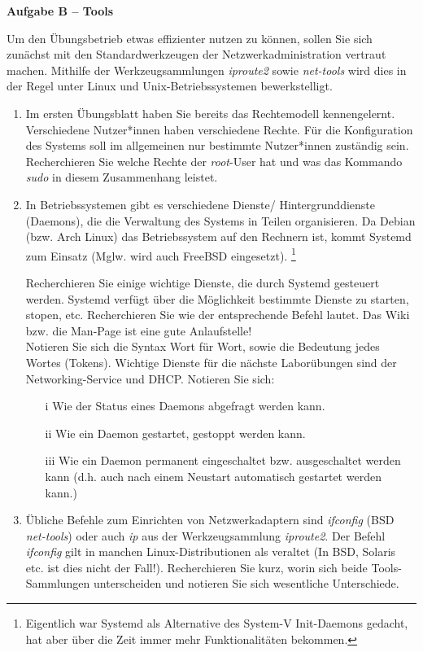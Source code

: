 \documentclass[paper=a4,fontsize=11pt]{scrartcl}%
\numberwithin{equation}{section}
\begin{document}
\begin{center}\Large{\textbf{Aufgabe B -- Tools}}\end{center}\vskip0.25in
Um den Übungsbetrieb etwas effizienter nutzen zu können, sollen Sie sich zunächst mit den Standardwerkzeugen der Netzwerkadministration vertraut machen. Mithilfe der Werkzeugsammlungen \emph{iproute2} sowie \emph{net-tools} wird dies in der Regel unter Linux und Unix-Betriebssystemen bewerkstelligt.
\begin{enumerate}
	\item Im ersten Übungsblatt haben Sie bereits das Rechtemodell kennengelernt. Verschiedene Nutzer*innen haben verschiedene Rechte. Für die Konfiguration des Systems soll im allgemeinen nur bestimmte Nutzer*innen zuständig sein. Recherchieren Sie welche Rechte der \emph{root}-User hat und was das Kommando \emph{sudo} in diesem Zusammenhang leistet.
	\item In Betriebssystemen gibt es verschiedene Dienste/ Hintergrunddienste (Daemons), die die Verwaltung des Systems in Teilen organisieren. Da Debian (bzw. Arch Linux) das Betriebssystem auf den Rechnern ist, kommt Systemd zum Einsatz (Mglw. wird auch FreeBSD eingesetzt). \footnote{Eigentlich war Systemd als Alternative des System-V Init-Daemons gedacht, hat aber über die Zeit immer mehr Funktionalitäten bekommen.}
	\begin{tasks}
		\task Recherchieren Sie einige wichtige Dienste, die durch Systemd gesteuert werden.
		\task Systemd verfügt über die Möglichkeit bestimmte Dienste zu starten, stopen, etc. Recherchieren Sie wie der entsprechende Befehl lautet. Das Wiki bzw. die Man-Page ist eine gute Anlaufstelle!\\
		Notieren Sie sich die Syntax Wort für Wort, sowie die Bedeutung jedes Wortes (Tokens). 
		\task Wichtige Dienste für die nächste Laborübungen sind der Networking-Service und DHCP. Notieren Sie sich:
		\begin{itemize}
			\item[i] Wie der Status eines Daemons abgefragt werden kann.
			\item[ii] Wie ein Daemon gestartet, gestoppt werden kann.
			\item[iii] Wie ein Daemon permanent eingeschaltet bzw. ausgeschaltet werden kann (d.h. auch nach einem Neustart automatisch gestartet werden kann.)
		\end{itemize}
	\end{tasks}
	\item Übliche Befehle zum Einrichten von Netzwerkadaptern sind \emph{ifconfig} (BSD \emph{net-tools}) oder auch \emph{ip} aus der Werkzeugsammlung \emph{iproute2}. Der Befehl \emph{ifconfig} gilt in manchen Linux-Distributionen als veraltet (In BSD, Solaris etc. ist dies nicht der Fall!). Recherchieren Sie kurz, worin sich beide Tools-Sammlungen unterscheiden und notieren Sie sich wesentliche Unterschiede.\\

\end{enumerate}
\end{document}
